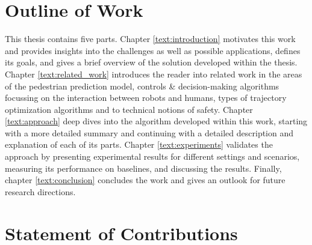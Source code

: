 \section{Outline of Work}
\label{text:introduction/outline}
This thesis contains five parts. Chapter \ref{text:introduction} motivates this work and provides insights into the challenges as well as possible applications, defines its goals, and gives a brief overview of the solution developed within the thesis. Chapter \ref{text:related_work} introduces the reader into related work in the areas of the pedestrian prediction model, controls \& decision-making algorithms focussing on the interaction between robots and humans, types of trajectory optimization algorithms and to technical notions of safety. Chapter \ref{text:approach} deep dives into the algorithm developed within this work, starting with a more detailed summary and continuing with a detailed description and explanation of each of its parts. Chapter \ref{text:experiments} validates the approach by presenting experimental results for different settings and scenarios, measuring its performance on baselines, and discussing the results. Finally, chapter \ref{text:conclusion} concludes the work and gives an outlook for future research directions.

\section{Statement of Contributions}
\label{text:introduction/contributions}

